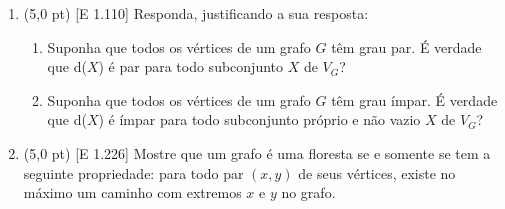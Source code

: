 \documentclass[12pt,a4paper,oneside]{article}
\begin{document}
\begin{enumerate}

	\item (5,0 pt) [E 1.110] Responda, justificando a sua resposta:
		\begin{enumerate}
			\item Suponha que todos os vértices de um grafo $G$ têm grau par. É verdade que d($X$) é par para todo subconjunto $X$ de $V_G$?
			\item Suponha que todos os vértices de um grafo $G$ têm grau ímpar. É verdade que d($X$) é ímpar para todo subconjunto próprio e não vazio $X$ de $V_G$?
		\end{enumerate}
	
	\item (5,0 pt) [E 1.226] Mostre que um grafo é uma floresta se e somente se tem a seguinte propriedade: para todo par $(x, y)$ de seus vértices, existe no máximo um caminho com extremos $x$ e $y$ no grafo.
	
	\end{enumerate}
\end{document}
